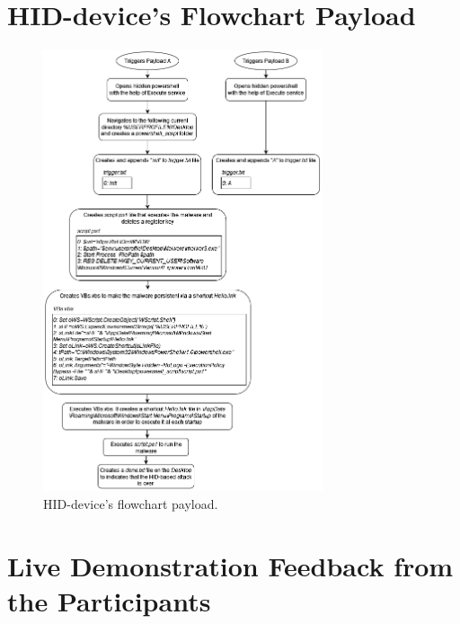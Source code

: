 \chapter{HID-device's Flowchart Payload}
\begin{figure}[H]
    \centering
    \vspace{-1cm}
    \includegraphics[height=13cm, angle=0, trim={0cm 0cm 0cm 0cm},clip]{figures/logigramme.png}
    \caption{HID-device's flowchart payload.}
    \label{fig:logigram}
\end{figure}

\chapter{Live Demonstration Feedback from the Participants}
\label{annex:feedback}

